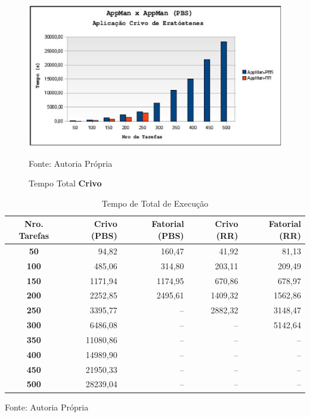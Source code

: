 \begin{figure}[hbtp]
\begin{center}
\includegraphics[scale=0.7]{./img/MapaCrivoTempoTotal.ps}
\caption{Tempo Total \textbf{Crivo}}
\label{fig:crivo_total}
Fonte: Autoria Própria
\end{center}
\end{figure}

\begin{table}[hbtp]
\begin{center}
\caption{Tempo de Total de Execução}
\label{tab:tempo_total}
\begin{tabular}{c|r|r|r|r}
	\hline
		{\bf Nro. Tarefas } & {\bf Crivo (PBS)} & {\bf Fatorial (PBS)} & {\bf Crivo (RR)} & {\bf Fatorial (RR)}\\
	\hline
	{\bf 50} & 94,82 & 160,47 & 41,92 & 81,13\\ \hline
	{\bf 100} & 485,06 & 314,80 & 203,11 & 209,49\\ \hline
	{\bf 150} & 1171,94 & 1174,95 & 670,86 & 678,97\\ \hline
	{\bf 200} & 2252,85 & 2495,61 & 1409,32 & 1562,86\\ \hline
	{\bf 250} & 3395,77 & -- & 2882,32 & 3148,47\\ \hline
	{\bf 300} & 6486,08 & -- & -- & 5142,64\\ \hline
	{\bf 350} & 11080,86 & -- & -- & --\\ \hline
	{\bf 400} & 14989,90 & -- & -- & --\\ \hline
	{\bf 450} & 21950,33 & -- & -- & --\\ \hline
	{\bf 500} & 28239,04 & -- & -- & --\\ \hline
\end{tabular}
\end{center}
\begin{center}
Fonte: Autoria Própria
\end{center}
\end{table}
	

